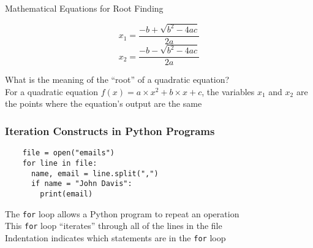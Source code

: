\documentclass[14pt,aspectratio=169]{beamer}
\begin{document}
%
\begin{frame}{Mathematical Equations for Root Finding}
  \vspace*{-.5in}
  \begin{center}
    \fontsize{20}{30}\selectfont
    \begin{equation*}
      x_1=\frac{-b+\sqrt{b^2-4ac}}{2a}
    \end{equation*}
    \begin{equation*}
      x_2=\frac{-b-\sqrt{b^2-4ac}}{2a}
    \end{equation*}
  \end{center}
  \vspace{.05ex}
  \begin{center}
    \small What is the meaning of the ``root'' of a quadratic equation? \\
    \small For a quadratic equation $f(x)= a \times x^2 + b \times x +c$, the
    variables $x_1$ and $x_2$ are the points where the equation's output are
    the same\\
  \end{center}
\end{frame}

%
\begin{frame}[fragile]
  \frametitle{Iteration Constructs in Python Programs}
  \normalsize
  \hspace*{-.65in}
  \begin{minipage}{6in}
    \vspace*{.25in}
    \begin{verbatim}
    file = open("emails")
    for line in file:
      name, email = line.split(",")
      if name = "John Davis":
        print(email)
    \end{verbatim}
  \end{minipage}
  \vspace*{.25in}
  \begin{center}
    \normalsize \noindent The {\tt for} loop allows a Python program to repeat an operation \\
    \normalsize \noindent This {\tt for} loop ``iterates'' through all of the lines in the file \\
    \normalsize \noindent Indentation indicates which statements are in the {\tt for} loop \\
  \end{center}
\end{frame}
\end{document}
